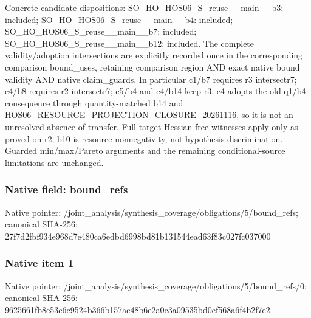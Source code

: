 \documentclass[10pt,a4paper]{article}
\begin{document}
\begingroup\raggedright\sloppy Concrete candidate dispositions:\allowbreak{} SO\_\allowbreak{}HO\_\allowbreak{}HOS06\_\allowbreak{}S\_\allowbreak{}reuse\_\allowbreak{}\_\allowbreak{}main\_\allowbreak{}\_\allowbreak{}b3:\allowbreak{} included;\allowbreak{} SO\_\allowbreak{}HO\_\allowbreak{}HOS06\_\allowbreak{}S\_\allowbreak{}reuse\_\allowbreak{}\_\allowbreak{}main\_\allowbreak{}\_\allowbreak{}b4:\allowbreak{} included;\allowbreak{} SO\_\allowbreak{}HO\_\allowbreak{}HOS06\_\allowbreak{}S\_\allowbreak{}reuse\_\allowbreak{}\_\allowbreak{}main\_\allowbreak{}\_\allowbreak{}b7:\allowbreak{} included;\allowbreak{} SO\_\allowbreak{}HO\_\allowbreak{}HOS06\_\allowbreak{}S\_\allowbreak{}reuse\_\allowbreak{}\_\allowbreak{}main\_\allowbreak{}\_\allowbreak{}b12:\allowbreak{} included. The complete validity/\allowbreak{}adoption intersections are explicitly recorded once in the corresponding comparison bound\_\allowbreak{}uses,\allowbreak{} retaining comparison region AND exact native bound validity AND native claim\_\allowbreak{}guards. In particular c1/\allowbreak{}b7 requires r3 intersectr7;\allowbreak{} c4/\allowbreak{}b8 requires r2 intersectr7;\allowbreak{} c5/\allowbreak{}b4 and c4/\allowbreak{}b14 keep r3. c4 adopts the old q1/\allowbreak{}b4 consequence through quantity-matched b14 and HOS06\_\allowbreak{}RESOURCE\_\allowbreak{}PROJECTION\_\allowbreak{}CLOSURE\_\allowbreak{}20261116,\allowbreak{} so it is not an unresolved absence of transfer. Full-target Hessian-free witnesses apply only as proved on r2;\allowbreak{} b10 is resource nonnegativity,\allowbreak{} not hypothesis discrimination. Guarded min/\allowbreak{}max/\allowbreak{}Pareto arguments and the remaining conditional-source limitations are unchanged.\par\endgroup

\subsubsection{Native field: bound\_\allowbreak{}refs}
Native pointer: /joint\_\allowbreak{}analysis/synthesis\_\allowbreak{}coverage/obligations/5/bound\_\allowbreak{}refs; canonical SHA-256: 27f7d2fbf934e968d7e480ca6edbd6998bd81b131544ead63f83c027fc037000

\subsubsection{Native item 1}
Native pointer: /joint\_\allowbreak{}analysis/synthesis\_\allowbreak{}coverage/obligations/5/bound\_\allowbreak{}refs/0; canonical SHA-256: 9625661fb8c53c6c9524b366b157ae48b6e2a0c3a09535bd0ef568a6f4b2f7e2
\end{document}
